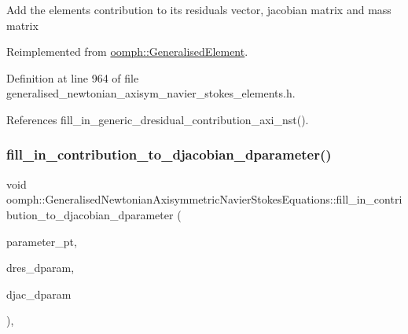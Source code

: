 Add the element\textquotesingle{}s contribution to its residuals vector, jacobian matrix and mass matrix 

Reimplemented from \hyperlink{classoomph_1_1GeneralisedElement_a2d6e3c918ebc1f270eebdf4eb1027093}{oomph\+::\+Generalised\+Element}.



Definition at line 964 of file generalised\+\_\+newtonian\+\_\+axisym\+\_\+navier\+\_\+stokes\+\_\+elements.\+h.



References fill\+\_\+in\+\_\+generic\+\_\+dresidual\+\_\+contribution\+\_\+axi\+\_\+nst().

\mbox{\label{classoomph_1_1GeneralisedNewtonianAxisymmetricNavierStokesEquations_a0b1b64308af0b8f6d5cd553e6f471413}} 
\subsubsection{\texorpdfstring{fill\+\_\+in\+\_\+contribution\+\_\+to\+\_\+djacobian\+\_\+dparameter()}{fill\_in\_contribution\_to\_djacobian\_dparameter()}}
{\footnotesize\ttfamily void oomph\+::\+Generalised\+Newtonian\+Axisymmetric\+Navier\+Stokes\+Equations\+::fill\+\_\+in\+\_\+contribution\+\_\+to\+\_\+djacobian\+\_\+dparameter (\begin{DoxyParamCaption}\item[{double $\ast$const \&}]{parameter\+\_\+pt,  }\item[{\hyperlink{classoomph_1_1Vector}{Vector}$<$ double $>$ \&}]{dres\+\_\+dparam,  }\item[{\hyperlink{classoomph_1_1DenseMatrix}{Dense\+Matrix}$<$ double $>$ \&}]{djac\+\_\+dparam }\end{DoxyParamCaption})\hspace{0.3cm}{\ttfamily [inline]}, {\ttfamily [virtual]}}



